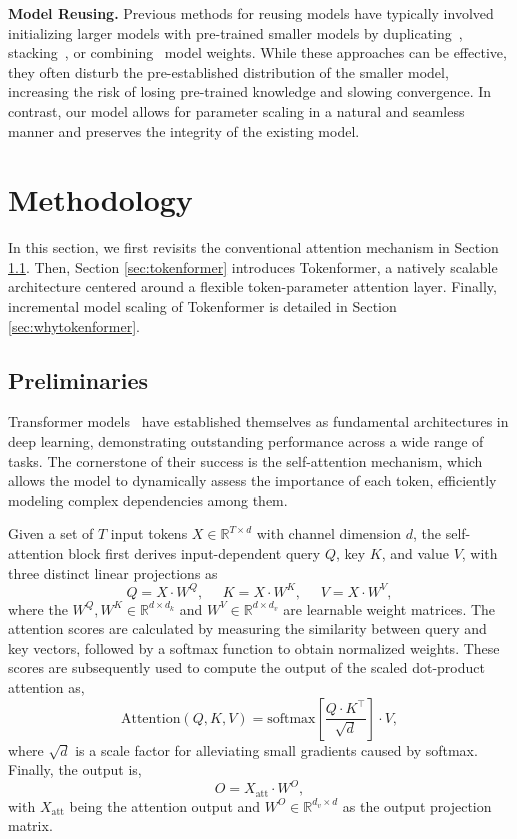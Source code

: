 \documentclass{article} %
\newcommand{\ourmethod}{Tokenformer\xspace}
\begin{document}
\textbf{Model Reusing.} Previous methods for reusing models have typically involved initializing larger models with pre-trained smaller models by duplicating~\citep{chen2015net2net,chen2021bert2bert}, stacking~\citep{gong2019efficient}, or combining~\citep{wang2023learning} model weights. While these approaches can be effective, they often disturb the pre-established distribution of the smaller model, increasing the risk of losing pre-trained knowledge and slowing convergence. In contrast, our model allows for parameter scaling in a natural and seamless manner and preserves the integrity of the existing model.

\section{Methodology}
In this section, we first revisits the conventional attention mechanism in Section \ref{sec:preliminary}. 
Then, Section \ref{sec:tokenformer} introduces {\ourmethod}, a natively scalable architecture centered around a flexible token-parameter attention layer. 
Finally, incremental model scaling of \ourmethod is detailed in Section \ref{sec:whytokenformer}.

\subsection{Preliminaries} \label{sec:preliminary}
Transformer models~\citep{vaswani2017attention} have established themselves as fundamental architectures in deep learning, demonstrating outstanding performance across a wide range of tasks. The cornerstone of their success is the self-attention mechanism, which allows the model to dynamically assess the importance of each token, efficiently modeling complex dependencies among them.

Given a set of $T$ input tokens $X \in \mathbb{R}^{T \times d}$ with channel dimension $d$, the self-attention block first derives input-dependent query $Q$, key $K$, and value $V$, with three distinct linear projections as
\begin{equation}
    Q = X \cdot W^{Q}, ~~~~~~K = X \cdot W^{K}, ~~~~~~V = X \cdot W^{V},
    \label{eq:qkv}
\end{equation}
where the $W^{Q}, W^{K} \in \mathbb{R}^{d \times d_k}$ and $ W^{V} \in \mathbb{R}^{d \times d_v}$ are learnable weight matrices. The attention scores are calculated by measuring the similarity between query and key vectors, followed by a softmax function to obtain normalized weights. These scores are subsequently used to compute the output of the scaled dot-product attention as,
\begin{equation}
    \text{Attention}(Q, K, V) = \text{softmax}[\frac{Q \cdot K^{\top}}{\sqrt{d}}]\cdot V,
    \label{eq:token_att}
\end{equation}
where $\sqrt{d}$ is a scale factor for alleviating small gradients caused by softmax. Finally, the output is,
\begin{equation}
    O = X_{\text{att}} \cdot W^{O},
    \label{eq:output}
\end{equation}
with $X_{\text{att}}$ being the attention output and $W^{O} \in \mathbb{R}^{d_v \times d}$ as the output projection matrix.
\end{document}

